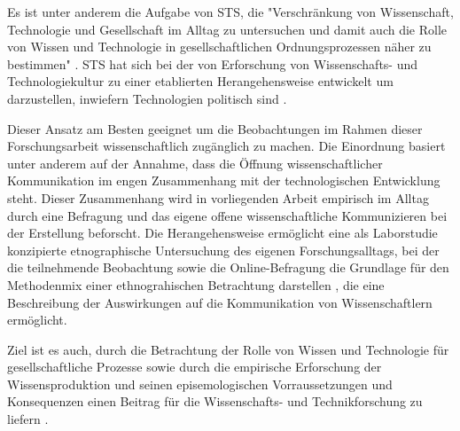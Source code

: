 Es ist unter anderem die Aufgabe von STS, die "Verschränkung von Wissenschaft, Technologie und Gesellschaft im Alltag zu untersuchen und damit auch die Rolle von Wissen und Technologie in gesellschaftlichen Ordnungsprozessen näher zu bestimmen" \cite{beck_2014_science}. STS hat sich bei der von Erforschung von Wissenschafts- und Technologiekultur zu einer etablierten Herangehensweise entwickelt um darzustellen, inwiefern Technologien politisch sind \cite{kelty_2014_freedom}.

Dieser Ansatz am Besten geeignet um die Beobachtungen im Rahmen dieser Forschungsarbeit wissenschaftlich zugänglich zu machen. Die Einordnung basiert unter anderem auf der Annahme, dass die Öffnung wissenschaftlicher Kommunikation im engen Zusammenhang mit der technologischen Entwicklung steht. Dieser Zusammenhang wird in vorliegenden Arbeit empirisch im Alltag durch eine Befragung und das eigene offene wissenschaftliche Kommunizieren bei der Erstellung beforscht. Die Herangehensweise ermöglicht eine als Laborstudie konzipierte etnographische Untersuchung des eigenen Forschungsalltags, bei der die teilnehmende Beobachtung sowie die Online-Befragung die Grundlage für den Methodenmix einer ethnograhischen Betrachtung darstellen \cite{bachmann_2006_ethnographie}, die eine Beschreibung der Auswirkungen auf die Kommunikation von Wissenschaftlern ermöglicht.

Ziel ist es auch, durch die Betrachtung der Rolle von Wissen und Technologie für gesellschaftliche Prozesse sowie durch die empirische Erforschung der Wissensproduktion und seinen episemologischen Vorraussetzungen und Konsequenzen einen Beitrag für die Wissenschafts- und Technikforschung zu liefern \cite{beck_2014_science}.
